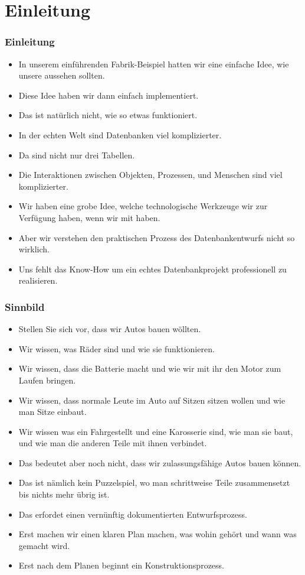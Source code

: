 \documentclass[aspectratio=169,mathserif,notheorems]{beamer}%
\subtitle{24.~Datenbanken Entwicklung}%
\begin{document}
%
%
\startPresentation%
%
\section{Einleitung}%
%
\begin{frame}%
\frametitle{Einleitung}%
\begin{itemize}%
\item In unserem einführenden Fabrik-Beispiel hatten wir eine einfache Idee, wie unsere  aussehen sollten.%
%
\item<2-> Diese Idee haben wir dann einfach implementiert.%
%
\item<3-> Das ist natürlich nicht, wie so etwas funktioniert.%
%
\item<4-> In der echten Welt sind Datenbanken viel komplizierter.%
%
\item<5-> Da sind nicht nur drei Tabellen.%
%
\item<6-> Die Interaktionen zwischen Objekten, Prozessen, und Menschen sind viel komplizierter.%
%
\item<7-> Wir haben eine grobe Idee, welche technologische Werkzeuge wir zur Verfügung haben, wenn wir mit  haben.%
%
\item<8-> Aber wir verstehen den praktischen Prozess des Datenbankentwurfs nicht so wirklich.%
%
\item<9-> Uns fehlt das Know-How um ein echtes Datenbankprojekt professionell zu realisieren.%
\end{itemize}%
\end{frame}%
%
\begin{frame}%
\frametitle{Sinnbild}%
\begin{itemize}%
%
\item Stellen Sie sich vor, dass wir Autos bauen wöllten.%
%
\item<2-> Wir wissen, was Räder sind und wie sie funktionieren.%
%
\item<3-> Wir wissen, dass die Batterie macht und wie wir mit ihr den Motor zum Laufen bringen.%
%
\item<4-> Wir wissen, dass normale Leute im Auto auf Sitzen sitzen wollen und wie man Sitze einbaut.%
%
\item<5-> Wir wissen was ein Fahrgestellt und eine Karosserie sind, wie man sie baut, und wie man die anderen Teile mit ihnen verbindet.%
%
\item<6-> Das bedeutet aber noch nicht, dass wir zulassungsfähige Autos bauen können.%
%
\item<7-> Das ist nämlich kein Puzzelspiel, wo man schrittweise Teile zusammensetzt bis nichts mehr übrig ist.%
%
\item<8-> Das erfordet einen vernünftig dokumentierten Entwurfsprozess.%
%
\item<9-> Erst machen wir einen klaren Plan machen, was wohin gehört und wann was gemacht wird.%
%
\item<10-> Erst nach dem Planen beginnt ein Konstruktionsprozess.%
\end{itemize}%
\end{frame}%
%
\end{document}
